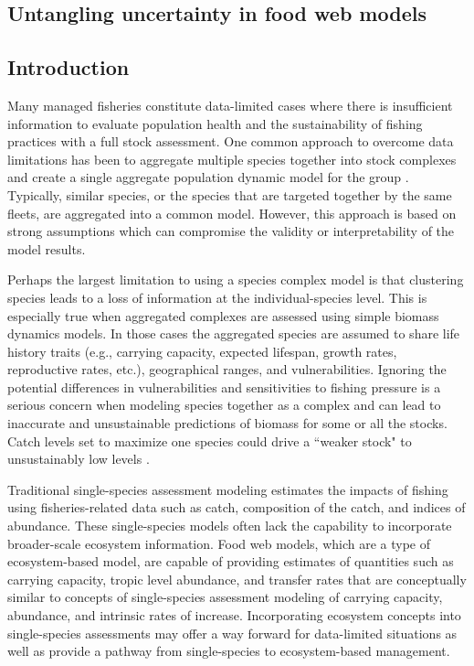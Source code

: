 \documentclass[oneside,12pt,final]{sty/ucthesis-CA2012}
\let\cite\citep                             %
\begin{document}
\begin{mainmatter}
\chapter{Untangling uncertainty in food web models}

\section*{Introduction}
Many managed fisheries constitute data-limited cases \cite{farmer2016stock} where there is insufficient information to evaluate population health and the sustainability of fishing practices with a full stock assessment. One common approach to overcome data limitations has been to aggregate multiple species together into stock complexes and create a single aggregate population dynamic model for the group \cite{cope2011approach}. Typically, similar species, or the species that are targeted together by the same fleets, are aggregated into a common model. However, this approach is based on strong assumptions which can compromise the validity or interpretability of the model results. 

\vspace{5mm}

Perhaps the largest limitation to using a species complex model is that clustering species leads to a loss of information at the individual-species level. This is especially true when aggregated complexes are assessed using simple biomass dynamics models. In those cases the aggregated species are assumed to share life history traits (e.g., carrying capacity, expected lifespan, growth rates, reproductive rates, etc.), geographical ranges, and vulnerabilities. Ignoring the potential differences in vulnerabilities and sensitivities to fishing pressure is a serious concern when modeling species together as a complex and can lead to inaccurate and unsustainable predictions of biomass for some or all the stocks. Catch levels set to maximize one species could drive a ``weaker stock" to  unsustainably low levels \cite{hastings2017marine}.

\vspace{5mm}

Traditional single-species assessment modeling estimates the impacts of fishing using fisheries-related data such as catch, composition of the catch, and indices of abundance. These single-species models often lack the capability to incorporate broader-scale ecosystem information. Food web models, which are a type of ecosystem-based model, are capable of providing estimates of quantities such as carrying capacity, tropic level abundance, and transfer rates that are conceptually similar to concepts of single-species assessment modeling of carrying capacity, abundance, and intrinsic rates of increase. Incorporating ecosystem concepts into single-species assessments may offer a way forward for data-limited situations as well as provide a pathway from single-species to ecosystem-based management.


\end{mainmatter}
\end{document}
